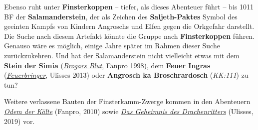 Ebenso ruht unter \textbf{Finsterkoppen} -- tiefer, als dieses Abenteuer führt -- bis 1011 BF der \textbf{Salamanderstein}, der als Zeichen des \textbf{Saljeth-Paktes} Symbol des geeinten Kampfs von Kindern Angroschs und Elfen gegen die Orkgefahr darstellt.
Die Suche nach diesem Artefakt könnte die Gruppe nach \textbf{Finsterkoppen} führen.
Genauso wäre es möglich, einige Jahre später im Rahmen dieser Suche zurückzukehren.
Und hat der Salamanderstein nicht vielleicht etwas mit dem \textbf{Stein der Simia} (\emph{\href{https://de.wiki-aventurica.de/wiki/Brogars_Blut}{Brogars Blut}}, Fanpro 1998), dem \textbf{Feuer Ingras} (\emph{\href{https://de.wiki-aventurica.de/wiki/Feuerbringer}{Feuerbringer}}, Ulisses 2013) oder \textbf{Angrosch ka Broschrardosch} (\emph{KK:111}) zu tun?

Weitere verlassene Bauten der Finsterkamm-Zwerge kommen in den Abenteuern \emph{\href{https://de.wiki-aventurica.de/wiki/Odem_der_Kälte}{Odem der Kälte}} (Fanpro, 2010) sowie \emph{\href{https://de.wiki-aventurica.de/wiki/Das_Geheimnis_des_Drachenritters}{Das Geheimnis des Drachenritters}} (Ulisses, 2019) vor.
\spaltenende
\begin{center}
	\end{center}

\neueseite

